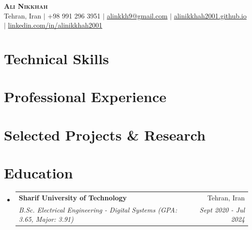 \documentclass[letterpaper,11pt]{article}
\makeatletter
\newcommand{\resumeSubheading}[4]{
	\vspace{-2pt}\item
	\begin{tabular*}{0.97\textwidth}[t]{l@{\extracolsep{\fill}}r}
		\textbf{#1} & #2 \\
		\textit{\small#3} & \textit{\small #4} \\
	\end{tabular*}\vspace{-7pt}
}
\newenvironment{resumeSubHeadingList}{\begin{itemize}[leftmargin=0.15in, label={}]}{\end{itemize}}
\makeatother
\begin{document}
	
	\begin{center}
		\textbf{\Huge \scshape Ali Nikkhah} \\ \vspace{1pt}
		\small Tehran, Iran $|$ +98 991 296 3951 $|$ 
		\href{mailto:alinkkh9@gmail.com}{alinkkh9@gmail.com} $|$ 
		\href{https://alinikkhah2001.github.io}{alinikkhah2001.github.io} $|$ 
		\href{https://linkedin.com/in/alinikkhah2001}{linkedin.com/in/alinikkhah2001}
	\end{center}
	
	\section{Technical Skills}
	
	
	\section{Professional Experience}
	\begin{resumeSubHeadingList}
	\end{resumeSubHeadingList}
	
	\section{Selected Projects \& Research}
	\begin{resumeSubHeadingList}
	\end{resumeSubHeadingList}
	
	\section{Education}
	\begin{resumeSubHeadingList}
		\resumeSubheading
		{Sharif University of Technology}{Tehran, Iran}
		{B.Sc. Electrical Engineering \-- Digital Systems (GPA: 3.65, Major: 3.91)}{Sept 2020 \-- Jul 2024}
	\end{resumeSubHeadingList}
	
\end{document}
